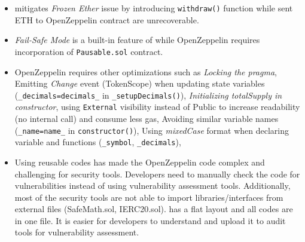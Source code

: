 {\begin{itemize}[noitemsep,topsep=0pt]
	\item \sys mitigates \textit{Frozen Ether} issue by introducing \texttt{withdraw()} function while sent ETH to OpenZeppelin contract are unrecoverable.

	\item \textit{Fail-Safe Mode} is a built-in feature of \sys while OpenZeppelin requires incorporation of \texttt{Pausable.sol} contract.

	\item OpenZeppelin requires other optimizations such as \textit{Locking the pragma}, Emitting \textit{Change} event (\cf TokenScope\cite{TokenScope}) when updating state variables (\eg \texttt{\_decimals=decimals\_} in \texttt{\_setupDecimals()}), \textit{Initializing totalSupply in constructor}, using \texttt{External} visibility instead of Public to increase readability (\ie no internal call) and consume less gas, Avoiding similar variable names (\eg \texttt{\_name=name\_} in \texttt{constructor()}), Using \textit{mixedCase} format when declaring variable and functions (\eg \texttt{\_symbol}, \texttt{\_decimals}), \etc

	\item Using reusable codes has made the OpenZeppelin code complex and challenging for security tools. Developers need to manually check the code for vulnerabilities instead of using vulnerability assessment tools. Additionally, most of the security tools are not able to import libraries/interfaces from external files (\eg SafeMath.sol, IERC20.sol). \sys has a flat layout and all codes are in one file. It is easier for developers to understand and upload it to audit tools for vulnerability assessment.
\end{itemize}

}


